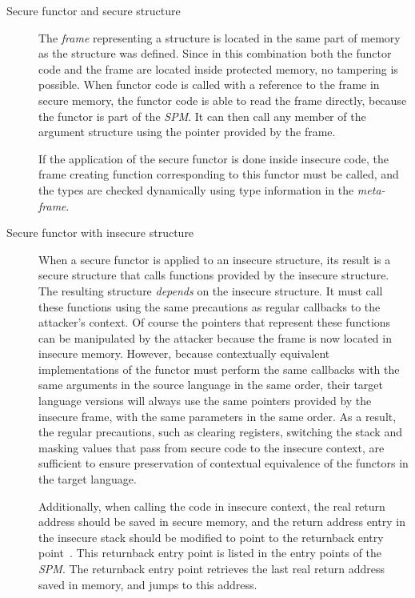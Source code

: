 \begin{description}
\item[Secure functor and secure structure] 
The \emph{frame} representing a structure is located in the same part of memory as the structure was defined.
Since in this combination both the functor code and the frame are located inside protected memory, no tampering is possible.
When functor code is called with a reference to the frame in secure memory, the functor code is able to read the frame directly, because the functor is part of the \emph{SPM}. It can then call any member of the argument structure using the pointer provided by the frame.

If the application of the secure functor is done inside insecure code, the frame creating function corresponding to this functor must be called, and the types are checked dynamically using type information in the \emph{meta-frame}.
\item[Secure functor with insecure structure]
When a secure functor is applied to an insecure structure, its result is a secure structure that calls functions provided by the insecure structure.
The resulting structure \emph{depends} on the insecure structure.
It must call these functions using the same precautions as regular callbacks to the attacker's context.
Of course the pointers that represent these functions can be manipulated by the attacker because the frame is now located in insecure memory.
However, because contextually equivalent implementations of the functor must perform the same callbacks with the same arguments in the source language in the same order, their target language versions will always use the same pointers provided by the insecure frame, with the same parameters in the same order.
As a result, the regular precautions, such as clearing registers, switching the stack and masking values that pass from secure code to the insecure context, are sufficient to ensure preservation of contextual equivalence of the functors in the target language. 

Additionally, when calling the code in insecure context, the real return address should be saved in secure memory, and the return address entry in the insecure stack should be modified to point to the returnback entry point~\cite{Agten:2012:SCM:2354412.2355247}.
This returnback entry point is listed in the entry points of the \emph{SPM}.
The returnback entry point retrieves the last real return address saved in memory, and jumps to this address.


\end{description}
